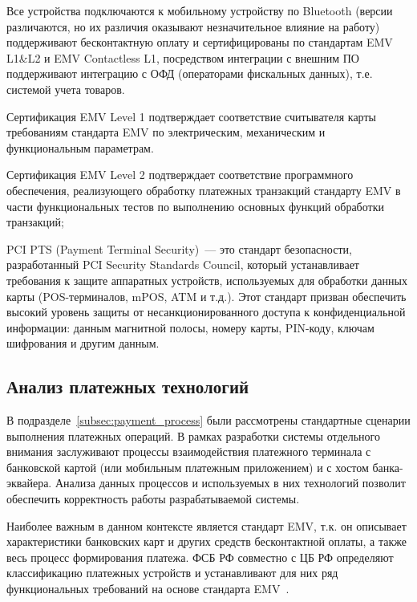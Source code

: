 
Все устройства подключаются к мобильному устройству по Bluetooth (версии различаются, но их различия оказывают незначительное влияние на работу) поддерживают бесконтактную оплату и сертифицированы по стандартам EMV L1\&L2 и EMV Contactless L1, посредством интеграции с внешним ПО поддерживают интеграцию с ОФД (операторами фискальных данных), т.е. системой учета товаров.

Сертификация EMV Level 1 подтверждает соответствие считывателя карты требованиям стандарта EMV по электрическим, механическим и функциональным параметрам.

Сертификация EMV Level 2 подтверждает соответствие программного обеспечения, реализующего обработку платежных транзакций стандарту EMV в части функциональных тестов по выполнению основных функций обработки транзакций;

PCI PTS (Payment Terminal Security)~--- это стандарт безопасности, разработанный PCI Security Standards Council, который устанавливает требования к защите аппаратных устройств, используемых для обработки данных карты (POS-терминалов, mPOS, ATM и т.д.).
Этот стандарт призван обеспечить высокий уровень защиты от несанкционированного доступа к конфиденциальной информации: данным магнитной полосы, номеру карты, PIN-коду, ключам шифрования и другим данным.


\subsection{Анализ платежных технологий}

В подразделе~\ref{subsec:payment_process} были рассмотрены стандартные сценарии выполнения платежных операций.
В рамках разработки системы отдельного внимания заслуживают процессы взаимодействия платежного терминала с банковской картой (или мобильным платежным приложением) и с хостом банка-эквайера.
Анализа данных процессов и используемых в них технологий позволит обеспечить корректность работы разрабатываемой системы.

Наиболее важным в данном контексте является стандарт EMV, т.к. он описывает характеристики банковских карт и других средств бесконтактной оплаты, а также весь процесс формирования платежа.
ФСБ РФ совместно с ЦБ РФ определяют классификацию платежных устройств и устанавливают для них ряд функциональных требований на основе стандарта EMV~\cite{cbr_requirements}.

